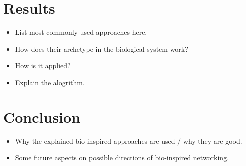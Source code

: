 \documentclass{IWORK2014}
\begin{document}
\section{Results}

\begin{itemize}
	\item List most commonly used approaches here.
	\item How does their archetype in the biological system work?
	\item How is it applied?
	\item Explain the alogrithm.
\end{itemize}

\section{Conclusion}
\begin{itemize}
	\item Why the explained bio-inspired approaches are used / why they are good.
	\item Some future aspects on possible directions of bio-inspired networking.
\end{itemize}




\end{document}
